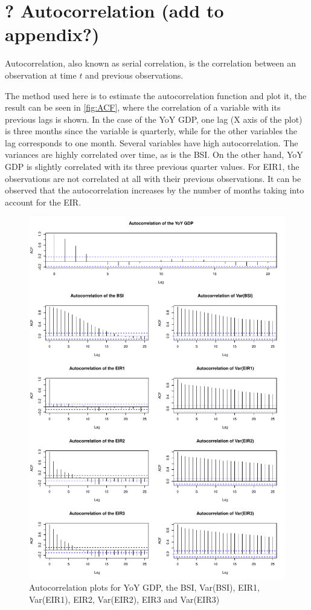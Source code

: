 \documentclass[12pt,a4paper,oneside]{book}
\begin{document}
\section{? Autocorrelation (add to appendix?)}

Autocorrelation, also known as serial correlation, is the correlation between an observation at time $t$ and previous observations.

The method used here is to estimate the autocorrelation function and plot it, the result can be seen in \autoref{fig:ACF}, where the correlation of a variable with its previous lags is shown. 
In the case of the YoY GDP, one lag (X axis of the plot) is three months since the variable is quarterly, while for the other variables the lag corresponds to one month.
Several variables have high autocorrelation. The variances are highly correlated over time, as is the BSI. 
On the other hand, YoY GDP is slightly correlated with its three previous quarter values. 
For EIR1, the observations are not correlated at all with their previous observations. It can be observed that the autocorrelation increases by the number of months taking into account for the EIR.


\begin{figure}[!htbp]
    \centering
    \includegraphics[scale=0.75]{Graphs/ACF.pdf}
    \caption{Autocorrelation plots for YoY GDP, the BSI, Var(BSI), EIR1, Var(EIR1), EIR2, Var(EIR2), EIR3 and Var(EIR3)}
    \label{fig:ACF}
\end{figure}
\end{document}
